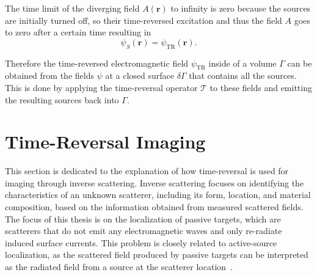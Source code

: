 The time limit of the diverging field \(A(\bm{r})\) to infinity is zero because the sources are initially turned off, so their time-reversed excitation and thus the field \(A\) goes to zero after a certain time resulting in
\begin{equation}
    \psi_S(\bm{r}) = \psi_{\text{TR}}(\bm{r}).
\end{equation}

Therefore the time-reversed electromagnetic field \(\psi_{\text{TR}}\) inside of a volume \(\Gamma \) can be obtained from the fields \(\psi \) at a closed surface \(\delta \Gamma \) that contains all the sources.
This is done by applying the time-reversal operator \(\mathcal{T}\) to these fields and emitting the resulting sources back into \(\Gamma \).



\section{Time-Reversal Imaging}
This section is dedicated to the explanation of how time-reversal is used for imaging through inverse scattering.
Inverse scattering focuses on identifying the characteristics of an unknown scatterer, including its form, location, and material composition, based on the information obtained from measured scattered fields.
The focus of this thesis is on the localization of passive targets, which are scatterers that do not emit any electromagnetic waves and only re-radiate induced surface currents.
This problem is closely related to active-source localization, as the scattered field produced by passive targets can be interpreted as the radiated field from a source at the scatterer location~\parencite{chen_computational_2018}.

